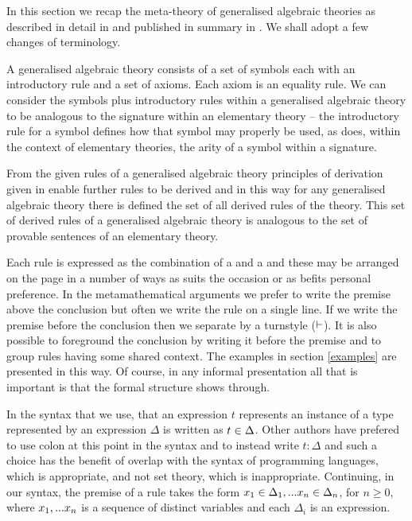 \label{generalisedalgrbraictheories}

In this section we recap the meta-theory of generalised algebraic theories 
as described in detail in \cite{Cartmell78}  and published in summary in \cite{Cartmell86}.
We shall adopt a few changes of terminology.

A generalised algebraic theory consists of a set of symbols each with an introductory rule and a set of axioms. 
Each axiom is an equality rule. We can consider the symbols plus introductory rules within a generalised algebraic theory to be analogous to the signature within an elementary theory --
the introductory rule for a symbol defines how that symbol may properly be used, as does, within the context of elementary theories, the arity of a symbol within a signature.

From the given rules of a generalised algebraic theory  principles of derivation given in \cite{Cartmell86} enable further rules
to be derived and in this way for any generalised algebraic theory there is defined the set of all derived rules of the theory. 
This set of derived rules of a generalised algebraic theory is analogous to the set of provable sentences of an elementary theory.
  
Each rule is expressed as the combination of a   and a  
and these may be arranged on the page in a number of ways as suits the occasion or as befits personal preference. 
In the metamathematical arguments we prefer to write the premise above the conclusion 
 but often we write the rule on a single line. 
If we write the premise before the conclusion then we separate by a turnstyle ($\vdash$). 
It is also possible to foreground the conclusion by writing it before the premise and to group rules having some shared context. The 
examples in section \ref{examples} are presented in this way.
Of course, in any informal presentation all that is important is that the formal structure shows through.  

In the syntax that we use,  that an expression $t$ represents an instance of a type represented by an expression $\Delta$ is written as $t \in \Delta$. Other authors have prefered to use colon at this point in the syntax  and to instead write $t:\Delta$ and such a choice has the benefit of overlap with the syntax
of programming languages, which is appropriate, and not set theory, which is inappropriate. Continuing, in our syntax,
the premise of a rule  takes the form $x_1 \in \Delta_1,... x_{n} \in \Delta_{n}$, for $n \geq 0$, where $x_1,...x_n$ is a sequence of distinct variables and each $\Delta_i$ is an expression.


